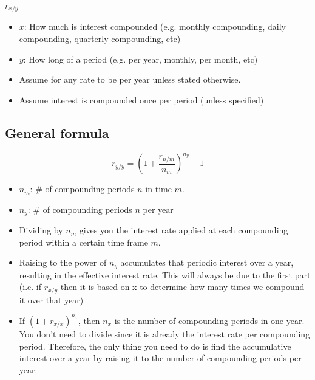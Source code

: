 \begin{intuition}
    $r_{x/y}$
    \begin{itemize}
        \item $x$: How much is interest compounded (e.g. monthly compounding, daily compounding, quarterly compounding, etc)
        \item $y$: How long of a period (e.g. per year, monthly, per month, etc)
    \end{itemize}
\end{intuition}

\begin{warning}
    \begin{itemize}
        \item Assume for any rate to be per year unless stated otherwise. 
        \item Assume interest is compounded once per period (unless specified)
    \end{itemize}
\end{warning}

\subsection{General formula}
\begin{definition}
    \begin{equation}
        r_{y/y} = \left(1 + \frac{r_{n/m}}{n_m}\right)^{n_y} - 1 
    \end{equation}
    \begin{itemize}
        \item $n_m$: \# of compounding periods $n$ in time $m$.
        \item $n_y$: \# of compounding periods $n$ per year
    \end{itemize}
\end{definition}

\begin{intuition}
    \begin{itemize}
        \item Dividing by $n_m$ gives you the interest rate applied at each compounding period within a certain time frame $m$.
        \item Raising to the power of $n_y$ accumulates that periodic interest over a year, resulting in the effective interest rate. This will always be due to the first part (i.e. if $r_{x/y}$ then it is based on x to determine how many times we compound it over that year)
        \item If $\left(1 + r_{x/x}\right)^{n_x}$, then $n_x$ is the number of compounding periods in one year. You don't need to divide since it is already the interest rate per compounding period. Therefore, the only thing you need to do is find the accumulative interest over a year by raising it to the number of compounding periods per year.
    \end{itemize}
\end{intuition}